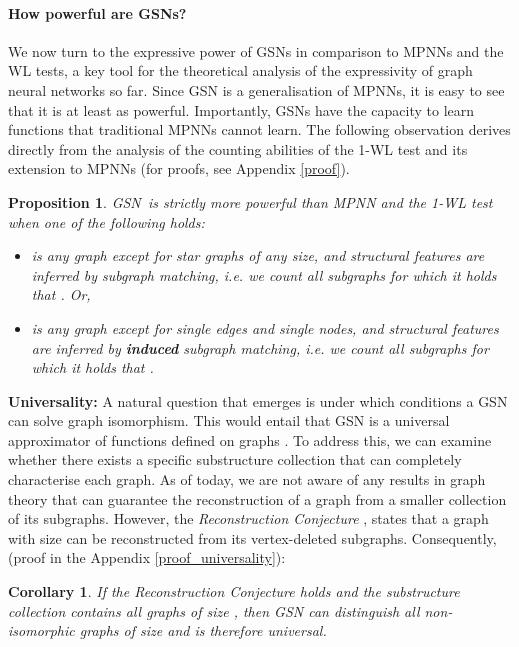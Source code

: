 \documentclass{article} \usepackage{iclr2021_conference,times}
\newtheorem{proposition}{Proposition}[section]
\newtheorem{corollary}{Corollary}[section]
\newcommand{\modelname}{GSN}
\begin{document}
\paragraph{How powerful are \modelname s?}


We now turn to the expressive power of \modelname s in comparison to MPNNs and the WL tests, a key tool for the theoretical analysis of the expressivity of graph neural networks so far. Since GSN is a generalisation of MPNNs, it is easy to see that it is at least as powerful. Importantly, \modelname s have the capacity to learn functions that traditional MPNNs cannot learn. The following observation derives directly from the analysis of the counting abilities of the 1-WL test  \citep{DBLP:conf/fct/ArvindFKV19} and its extension to MPNNs \citep{chen2020can} (for proofs, see Appendix \ref{proof}). 

\begin{proposition}\label{as_expressive}
\modelname\ is strictly more powerful than MPNN and the 1-WL test when one of the following holds:
\begin{itemize}
    \item  is any graph except for star graphs of any size, and structural features are inferred by subgraph matching, i.e. we count all subgraphs  for which it holds that . Or,
    \item  is any graph except for single edges and single nodes,     and structural features are inferred by \textbf{induced} subgraph matching, i.e. we count all subgraphs  for which it holds that .
\end{itemize}
\end{proposition}

\noindent\textbf{Universality:} A natural question that emerges is under which conditions a GSN can solve graph isomorphism. This would entail that GSN is a universal approximator of functions defined on graphs \citep{clip_ijcai20, chen2019equivalence}. To address this, we can examine whether there exists a specific substructure collection that can completely characterise each graph. As of today, we are not aware of any results in graph theory that can guarantee the reconstruction of a graph from a smaller collection of its subgraphs. However, the \textit{Reconstruction Conjecture} \citep{kelly1957congruence, ulam1960collection}, states that a graph with size  can be reconstructed from its vertex-deleted subgraphs. Consequently, (proof in the Appendix \ref{proof_universality}):
\begin{corollary}\label{recon_conj}
If the Reconstruction Conjecture holds and the substructure collection  contains all graphs of size , then GSN can distinguish all non-isomorphic graphs of size  and is therefore universal. 
\end{corollary}
\end{document}
